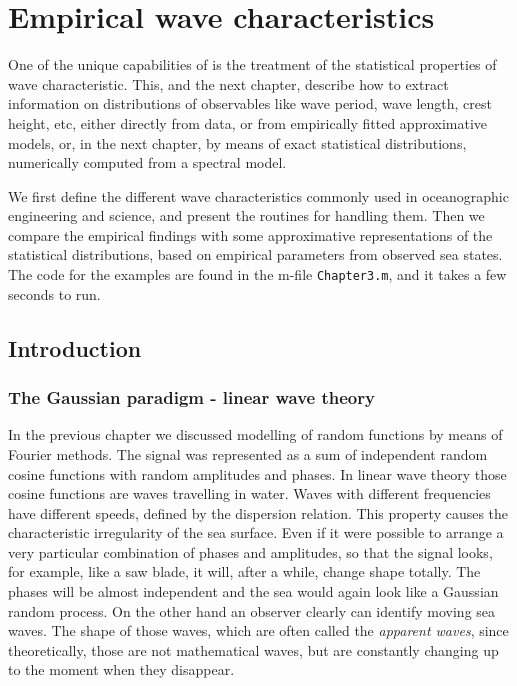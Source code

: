%
\chapter[Empirical wave characteristics]{%
Empirical wave characteristics}
\label{cha:distr-appar-wave-data}\label{cha:3}

One of the unique capabilities of \progname{} is the treatment of
the statistical properties of wave characteristic. This, and the next chapter,
describe how to extract information on distributions of observables like
wave period, wave length, crest height, etc, either directly from data, or
from empirically fitted approximative models, or, in the next chapter, by means
of exact statistical distributions, numerically computed from a spectral model.

We first define the different wave characteristics commonly used in
oceanographic engineering and science, and present the \progname{} routines
for handling them. Then we compare the empirical findings with some
approximative representations of the statistical distributions, based
on empirical parameters from observed sea states. The code for the examples
are found in the m-file \verb+Chapter3.m+, and it takes a few seconds to run.

\section{Introduction}
\subsection{The Gaussian paradigm - linear wave theory}\label{ss:gaussianparadigm}
In the previous chapter we discussed modelling of random functions by
means of Fourier methods. The signal was represented as a sum of
independent random cosine functions with random amplitudes and phases. In linear
wave theory those cosine functions are waves travelling in water. Waves
with different frequencies have different speeds, defined by the
dispersion relation. 
This property causes the characteristic
irregularity of the sea surface. Even if it were possible to arrange a very
particular combination of phases and amplitudes, so that the signal
looks, for example, like a saw blade, it will, after a while, change
shape totally. The phases will be almost independent and the sea would
again look like a Gaussian random process. On the other hand an
observer clearly can identify moving  sea waves. The shape of those
waves, which are often called the
{\sl apparent  waves},
since theoretically, those are not mathematical waves, but are constantly
changing up to the moment when they disappear.

